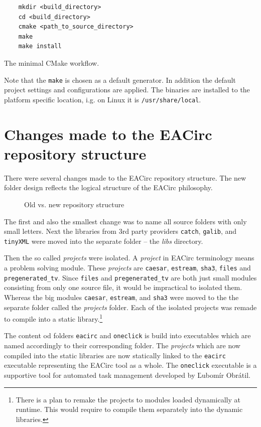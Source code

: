 \documentclass[12pt,oneside]{fithesis2}
\begin{document}
\begin{listing}[H]
	\begin{verbatim}
	mkdir <build_directory>
	cd <build_directory>
	cmake <path_to_source_directory>
	make
	make install
	\end{verbatim}
	\caption{The minimal CMake workflow.}
\end{listing}

\noindent
Note that the \texttt{make} is chosen as a default generator. In addition the default project settings and configurations are applied. The binaries are installed to the platform specific location, i.g. on Linux it is \texttt{/usr/share/local}.

\section{Changes made to the EACirc repository structure}

There were several changes made to the EACirc repository structure. The new folder design reflects the logical structure of the EACirc philosophy.

	\begin{figure}[H]
	\centering
	
	\caption{Old vs. new repository structure}
	\end{figure}
	
\noindent
The first and also the smallest change was to name all source folders with only small letters. Next the libraries from 3rd party providers \texttt{catch}, \texttt{galib}, and \texttt{tinyXML} were moved into the separate folder -- the \emph{libs} directory.

Then the so called \emph{projects} were isolated. A \emph{project} in EACirc terminology means a problem solving module. These \emph{projects} are \texttt{caesar}, \texttt{estream}, \texttt{sha3}, \texttt{files} and \texttt{pregenerated\_tv}. Since \texttt{files} and \texttt{pregenerated\_tv} are both just small modules consisting from only one source file, it would be impractical to isolated them. Whereas the big modules \texttt{caesar}, \texttt{estream}, and \texttt{sha3} were moved to the the separate folder called the \emph{projects} folder. Each of the isolated projects was remade to compile into a static library.\footnote{There is a plan to remake the projects to modules loaded dynamically at runtime. This would require to compile them separately into the dynamic libraries.}

The content od folders \texttt{eacirc} and \texttt{oneclick} is build into executables which are named accordingly to their corresponding folder. The \emph{projects} which are now compiled into the static libraries are now statically linked to the \texttt{eacirc} executable representing the EACirc tool as a whole. The \texttt{oneclick} executable is a supportive tool for automated task management developed by Ľubomír Obrátil. \cite{oneclick}
\end{document}
